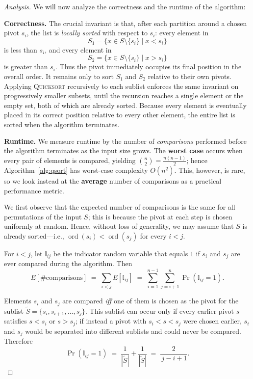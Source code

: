 \documentclass[12pt,a4paper]{article}
\newenvironment{analysis}[1][Analysis]%
{\begin{proof}[#1]}%
	{\end{proof}}
\begin{document}
	\begin{analysis}
		We will now analyze the correctness and the runtime of the algorithm:
		
		\textbf{Correctness.}  
		The crucial invariant is that, after each partition around a chosen pivot \(s_i\), the list is \emph{locally sorted} with respect to \(s_i\): every element in  
		\[
		S_1=\{x\in S\setminus\{s_i\}\mid x<s_i\}
		\]
		is less than \(s_i\), and every element in  
		\[
		S_2=\{x\in S\setminus\{s_i\}\mid x>s_i\}
		\]
		is greater than \(s_i\). Thus the pivot immediately occupies its final position in the overall order.  
		It remains only to sort \(S_1\) and \(S_2\) relative to their own pivots. Applying \textsc{Quicksort} recursively to each sublist enforces the same invariant on progressively smaller subsets, until the recursion reaches a single element or the empty set, both of which are already sorted.  
		Because every element is eventually placed in its correct position relative to every other element, the entire list is sorted when the algorithm terminates.
		
		\textbf{Runtime.}  
		We measure runtime by the number of \emph{comparisons} performed before the algorithm terminates as the input size grows.  The \textbf{worst case} occurs when every pair of elements is compared, yielding \(\binom{n}{2}=\frac{n(n-1)}{2}\); hence Algorithm~\ref{alg:qsort} has worst-case complexity \(O(n^{2})\).  This, however, is rare, so we look instead at the \textbf{average} number of comparisons as a practical performance metric.
		
		We first observe that the expected number of comparisons is the same for all permutations of the input \(S\); this is because the pivot at each step is chosen uniformly at random. Hence, without loss of generality, we may assume that \(S\) is already sorted—i.e., \(\operatorname{ord}(s_i)<\operatorname{ord}(s_j)\) for every \(i<j\).
		
		For \(i<j\), let \(\mathbb{I}_{ij}\) be the indicator random variable that equals \(1\) if \(s_i\) and \(s_j\) are ever compared during the algorithm. Then
		\[
		E[\text{\# comparisons}]
		\;=\;\sum_{i<j}E[\mathbb{I}_{ij}]
		\;=\;\sum_{i=1}^{n-1}\sum_{j=i+1}^{n}\Pr(\mathbb{I}_{ij}=1).
		\]
		
		Elements \(s_i\) and \(s_j\) are compared \emph{iff} one of them is chosen as the pivot for the sublist
		\(\tilde{S}=\{s_i,s_{i+1},\dots,s_j\}\).
		This sublist can occur only if every earlier pivot \(s\) satisfies \(s<s_i\) or \(s>s_j\); if instead a pivot with \(s_i<s<s_j\) were chosen earlier, \(s_i\) and \(s_j\) would be separated into different sublists and could never be compared.  Therefore
		\[
		\Pr(\mathbb{I}_{ij}=1)
		\;=\;\frac{1}{|\tilde{S}|}+\frac{1}{|\tilde{S}|}
		\;=\;\frac{2}{\,j-i+1}.
		\]
		

\end{analysis}
\end{document}
